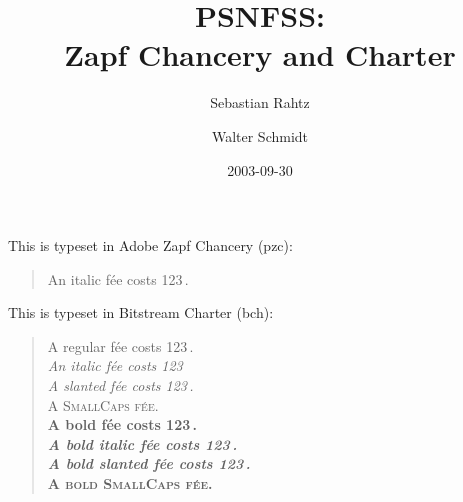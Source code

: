 \documentclass[11pt]{article}
\begin{document}
\frenchspacing
\title{PSNFSS:\\ Zapf Chancery and Charter}
\author{Sebastian Rahtz \and Walter Schmidt}
\date{2003-09-30}
\maketitle
\def\Try#1#2{%
\fontfamily{#1}\selectfont
This is typeset in #2 (#1):
\begin{quote}
\raggedright
A regular f\'ee costs 123\,\texteuro.\\
\textit{An italic f\'ee costs 123\,\texteuro}\\
\textsl{A slanted f\'ee costs 123\,\texteuro.}\\
\textsc{A SmallCaps f\'ee.}\\
{\bfseries A bold f\'ee costs 123\,\texteuro.\\
 \textit{A bold italic f\'ee costs 123\,\texteuro.}\\
 \textsl{A bold slanted f\'ee costs 123\,\texteuro.}\\
 \textsc{A bold SmallCaps f\'ee.}\\
}
\end{quote}
\par
}

This is typeset in Adobe Zapf Chancery (pzc):
\begin{quote}
\selectfont
An italic f\'ee costs 123\,\texteuro.
\end{quote}

\Try{bch}{Bitstream Charter}
\end{document}

